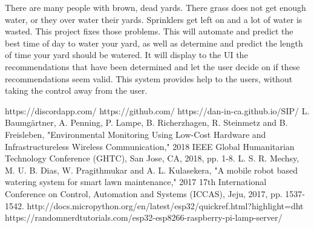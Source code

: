 \documentclass[letterpaper, 10 pt, conference]{ieeeconf}  %
\begin{document}
There are many people with brown, dead yards. There grass does not get enough water, or they over water their yards. Sprinklers get left on and a lot of water is wasted. This project fixes those problems. This will automate and predict the best time of day to water your yard, as well as determine and predict the length of time your yard should be watered. It will display to the UI the recommendations that have been determined and let the user decide on if these recommendations seem valid. This system provides help to the users, without taking the control away from the user. 




\begin{thebibliography}{99}
 https://discordapp.com/
 https://github.com/
 https://dan-in-ca.github.io/SIP/
 L. Baumgärtner, A. Penning, P. Lampe, B. Richerzhagen, R. Steinmetz and B. Freisleben, "Environmental Monitoring Using Low-Cost Hardware and Infrastructureless Wireless Communication," 2018 IEEE Global Humanitarian Technology Conference (GHTC), San Jose, CA, 2018, pp. 1-8.
 L. S. R. Mechsy, M. U. B. Dias, W. Pragithmukar and A. L. Kulasekera, "A mobile robot based watering system for smart lawn maintenance," 2017 17th International Conference on Control, Automation and Systems (ICCAS), Jeju, 2017, pp. 1537-1542.
 http://docs.micropython.org/en/latest/esp32/quickref.html?highlight=dht
 https://randomnerdtutorials.com/esp32-esp8266-raspberry-pi-lamp-server/
\end{thebibliography}


\end{document}
